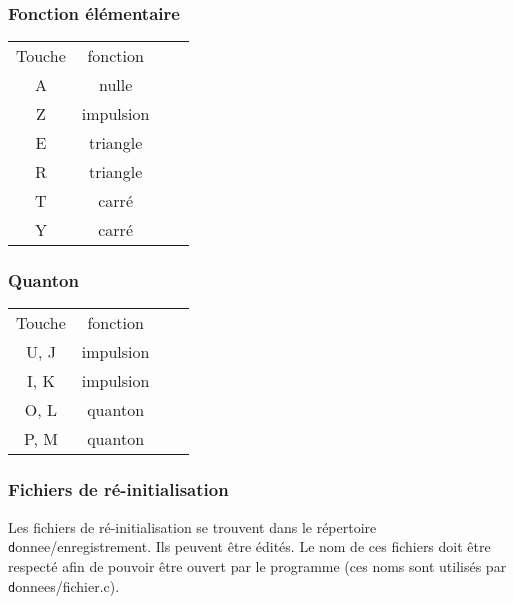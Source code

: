 \subsubsection{Fonction élémentaire}
%
\begin{center}
\begin{tabular}{cc cc}%
Touche & fonction \\
A & nulle &\\
Z & impulsion &\\
E & triangle&\\
R & triangle&\\
T & carré &\\
Y & carré &\\
\end{tabular}
\end{center}
%
\subsubsection{Quanton}
%
\begin{center}
\begin{tabular}{cc cc}%
Touche & fonction \\
U, J & impulsion &\\
I, K & impulsion &\\
O, L & quanton &\\
P, M & quanton &\\
\end{tabular}
\end{center}

\subsubsection{Fichiers de ré-initialisation}
Les fichiers de ré-initialisation se trouvent dans le répertoire {\texttt donnee/enregistrement}. Ils peuvent être édités. Le nom de ces fichiers doit être respecté afin de pouvoir être ouvert par le programme (ces noms sont utilisés par {\texttt donnees/fichier.c}).
%
%
%
